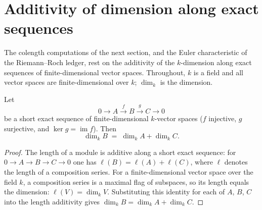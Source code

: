 \section{Additivity of dimension along exact sequences}
\label{sec:finrank_additivity}

The colength computations of the next section, and the Euler characteristic of the
Riemann--Roch ledger, rest on the additivity of the \(k\)-dimension along exact sequences of
finite-dimensional vector spaces. Throughout, \(k\) is a field and all vector spaces are
finite-dimensional over \(k\); \(\dim_k\) is the dimension.

\begin{theorem}
  \label{thm:finrank_add_of_exact}
  \leanok
  Let
  \[
    0 \longrightarrow A \xrightarrow{\ f\ } B \xrightarrow{\ g\ } C \longrightarrow 0
  \]
  be a short exact sequence of finite-dimensional \(k\)-vector spaces (\(f\) injective, \(g\)
  surjective, and \(\ker g = \operatorname{im} f\)). Then
  \[
    \dim_k B \;=\; \dim_k A + \dim_k C .
  \]
\end{theorem}
\begin{proof}
  \leanok
  The length of a module is additive along a short exact sequence: for
  \(0 \to A \to B \to C \to 0\) one has \(\ell(B) = \ell(A) + \ell(C)\), where \(\ell\) denotes
  the length of a composition series. For a finite-dimensional vector space over the field
  \(k\), a composition series is a maximal flag of subspaces, so its length equals the
  dimension: \(\ell(V) = \dim_k V\). Substituting this identity for each of \(A\), \(B\),
  \(C\) into the length additivity gives \(\dim_k B = \dim_k A + \dim_k C\).
\end{proof}

